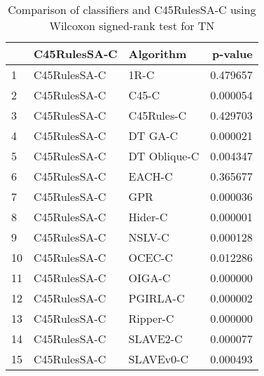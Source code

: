 \begin{table}
\footnotesize
\caption{Comparison of classifiers and C45RulesSA-C using Wilcoxon signed-rank test for TN}
\label{tab:C45RulesSA-C wilcoxon TN comparison}
\begin{tabular}{lllr}
\hline
 & C45RulesSA-C & Algorithm & p-value \\
\hline
1 & C45RulesSA-C & 1R-C & 0.479657 \\
2 & C45RulesSA-C & C45-C & 0.000054 \\
3 & C45RulesSA-C & C45Rules-C & 0.429703 \\
4 & C45RulesSA-C & DT GA-C & 0.000021 \\
5 & C45RulesSA-C & DT Oblique-C & 0.004347 \\
6 & C45RulesSA-C & EACH-C & 0.365677 \\
7 & C45RulesSA-C & GPR & 0.000036 \\
8 & C45RulesSA-C & Hider-C & 0.000001 \\
9 & C45RulesSA-C & NSLV-C & 0.000128 \\
10 & C45RulesSA-C & OCEC-C & 0.012286 \\
11 & C45RulesSA-C & OIGA-C & 0.000000 \\
12 & C45RulesSA-C & PGIRLA-C & 0.000002 \\
13 & C45RulesSA-C & Ripper-C & 0.000000 \\
14 & C45RulesSA-C & SLAVE2-C & 0.000077 \\
15 & C45RulesSA-C & SLAVEv0-C & 0.000493 \\
\hline
\end{tabular}
\end{table}
